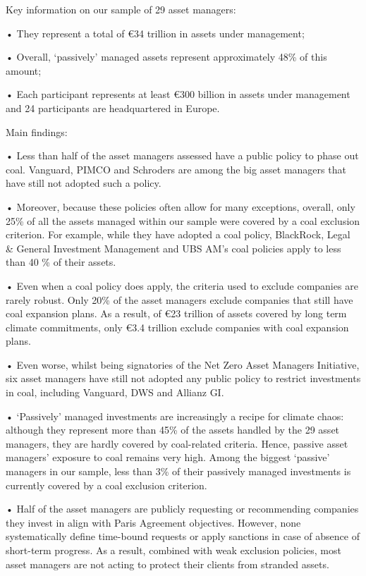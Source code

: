 \documentclass[
]{book}
\begin{document}
Key information on our sample of 29 asset managers:

• They represent a total of €34 trillion in assets under
management;

• Overall, `passively' managed assets represent approximately
48\% of this amount;

• Each participant represents at least €300 billion in assets
under management and 24 participants are headquartered
in Europe.

Main findings:

• Less than half of the asset managers assessed have a public policy to phase
out coal. Vanguard, PIMCO and Schroders are among the big asset managers
that have still not adopted such a policy.

• Moreover, because these policies often allow for many exceptions, overall,
only 25\% of all the assets managed within our sample were covered by a
coal exclusion criterion. For example, while they have adopted a coal policy,
BlackRock, Legal \& General Investment Management and UBS AM's coal
policies apply to less than 40 \% of their assets.

• Even when a coal policy does apply, the criteria used to exclude companies
are rarely robust. Only 20\% of the asset managers exclude companies that
still have coal expansion plans. As a result, of €23 trillion of assets covered by
long term climate commitments, only €3.4 trillion exclude companies with
coal expansion plans.

• Even worse, whilst being signatories of the Net Zero Asset Managers
Initiative, six asset managers have still not adopted any public policy to
restrict investments in coal, including Vanguard, DWS and Allianz GI.

• `Passively' managed investments are increasingly a recipe for climate
chaos: although they represent more than 45\% of the assets handled by the
29 asset managers, they are hardly covered by coal-related criteria. Hence,
passive asset managers' exposure to coal remains very high. Among the
biggest `passive' managers in our sample, less than 3\% of their passively
managed investments is currently covered by a coal exclusion criterion.

• Half of the asset managers are publicly requesting or recommending
companies they invest in align with Paris Agreement objectives. However,
none systematically define time-bound requests or apply sanctions in case
of absence of short-term progress. As a result, combined with weak exclusion
policies, most asset managers are not acting to protect their clients from
stranded assets.
\end{document}
